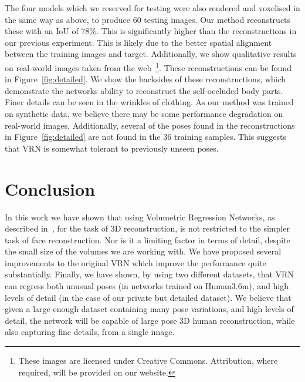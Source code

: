 The four models which we reserved for testing were also rendered and
voxelised in the same way as above, to produce 60 testing images. Our
method reconstructs these with an IoU of 78\%. This is significantly
higher than the reconstructions in our previous experiment. This is
likely due to the better spatial alignment between the training images
and target. Additionally, we show qualitative results on real-world
images taken from the web~\footnote{These images are licensed under
  Creative Commons. Attribution, where required, will be provided on
  our website.}. These reconstructions can be found in
Figure~\ref{fig:detailed}. We show the backsides of these
reconstructions, which demonstrate the networks ability to reconstruct
the self-occluded body parts. Finer details can be seen in the
wrinkles of clothing. As our method was trained on synthetic data, we
believe there may be some performance degradation on real-world
images. Additionally, several of the poses found in the
reconstructions in Figure~\ref{fig:detailed} are not found in the 36
training samples. This suggests that VRN is somewhat tolerant to
previously unseen poses.



\section{Conclusion}

In this work we have shown that using Volumetric Regression Networks,
as described in~\cite{jackson2017vrn}, for the task of 3D
reconstruction, is not restricted to the simpler task of face
reconstruction. Nor is it a limiting factor in terms of detail,
despite the small size of the volumes we are working with. We have
proposed several improvements to the original VRN which improve the
performance quite substantially. Finally, we have shown, by using two
different datasets, that VRN can regress both unusual poses (in
networks trained on Human3.6m), and high levels of detail (in the case
of our private but detailed dataset). We believe that given a large
enough dataset containing many pose variations, and high levels of
detail, the network will be capable of large pose 3D human
reconstruction, while also capturing fine details, from a single
image.

